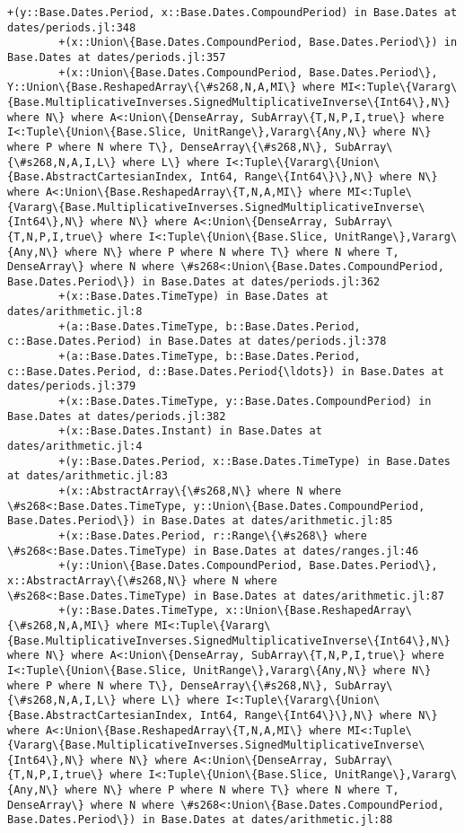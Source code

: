 \documentclass[11pt]{article}
\begin{document}
\begin{Verbatim}[commandchars=\\\{\}]
        +(y::Base.Dates.Period, x::Base.Dates.CompoundPeriod) in Base.Dates at dates/periods.jl:348
        +(x::Union\{Base.Dates.CompoundPeriod, Base.Dates.Period\}) in Base.Dates at dates/periods.jl:357
        +(x::Union\{Base.Dates.CompoundPeriod, Base.Dates.Period\}, Y::Union\{Base.ReshapedArray\{\#s268,N,A,MI\} where MI<:Tuple\{Vararg\{Base.MultiplicativeInverses.SignedMultiplicativeInverse\{Int64\},N\} where N\} where A<:Union\{DenseArray, SubArray\{T,N,P,I,true\} where I<:Tuple\{Union\{Base.Slice, UnitRange\},Vararg\{Any,N\} where N\} where P where N where T\}, DenseArray\{\#s268,N\}, SubArray\{\#s268,N,A,I,L\} where L\} where I<:Tuple\{Vararg\{Union\{Base.AbstractCartesianIndex, Int64, Range\{Int64\}\},N\} where N\} where A<:Union\{Base.ReshapedArray\{T,N,A,MI\} where MI<:Tuple\{Vararg\{Base.MultiplicativeInverses.SignedMultiplicativeInverse\{Int64\},N\} where N\} where A<:Union\{DenseArray, SubArray\{T,N,P,I,true\} where I<:Tuple\{Union\{Base.Slice, UnitRange\},Vararg\{Any,N\} where N\} where P where N where T\} where N where T, DenseArray\} where N where \#s268<:Union\{Base.Dates.CompoundPeriod, Base.Dates.Period\}) in Base.Dates at dates/periods.jl:362
        +(x::Base.Dates.TimeType) in Base.Dates at dates/arithmetic.jl:8
        +(a::Base.Dates.TimeType, b::Base.Dates.Period, c::Base.Dates.Period) in Base.Dates at dates/periods.jl:378
        +(a::Base.Dates.TimeType, b::Base.Dates.Period, c::Base.Dates.Period, d::Base.Dates.Period{\ldots}) in Base.Dates at dates/periods.jl:379
        +(x::Base.Dates.TimeType, y::Base.Dates.CompoundPeriod) in Base.Dates at dates/periods.jl:382
        +(x::Base.Dates.Instant) in Base.Dates at dates/arithmetic.jl:4
        +(y::Base.Dates.Period, x::Base.Dates.TimeType) in Base.Dates at dates/arithmetic.jl:83
        +(x::AbstractArray\{\#s268,N\} where N where \#s268<:Base.Dates.TimeType, y::Union\{Base.Dates.CompoundPeriod, Base.Dates.Period\}) in Base.Dates at dates/arithmetic.jl:85
        +(x::Base.Dates.Period, r::Range\{\#s268\} where \#s268<:Base.Dates.TimeType) in Base.Dates at dates/ranges.jl:46
        +(y::Union\{Base.Dates.CompoundPeriod, Base.Dates.Period\}, x::AbstractArray\{\#s268,N\} where N where \#s268<:Base.Dates.TimeType) in Base.Dates at dates/arithmetic.jl:87
        +(y::Base.Dates.TimeType, x::Union\{Base.ReshapedArray\{\#s268,N,A,MI\} where MI<:Tuple\{Vararg\{Base.MultiplicativeInverses.SignedMultiplicativeInverse\{Int64\},N\} where N\} where A<:Union\{DenseArray, SubArray\{T,N,P,I,true\} where I<:Tuple\{Union\{Base.Slice, UnitRange\},Vararg\{Any,N\} where N\} where P where N where T\}, DenseArray\{\#s268,N\}, SubArray\{\#s268,N,A,I,L\} where L\} where I<:Tuple\{Vararg\{Union\{Base.AbstractCartesianIndex, Int64, Range\{Int64\}\},N\} where N\} where A<:Union\{Base.ReshapedArray\{T,N,A,MI\} where MI<:Tuple\{Vararg\{Base.MultiplicativeInverses.SignedMultiplicativeInverse\{Int64\},N\} where N\} where A<:Union\{DenseArray, SubArray\{T,N,P,I,true\} where I<:Tuple\{Union\{Base.Slice, UnitRange\},Vararg\{Any,N\} where N\} where P where N where T\} where N where T, DenseArray\} where N where \#s268<:Union\{Base.Dates.CompoundPeriod, Base.Dates.Period\}) in Base.Dates at dates/arithmetic.jl:88

\end{Verbatim}
\end{document}
